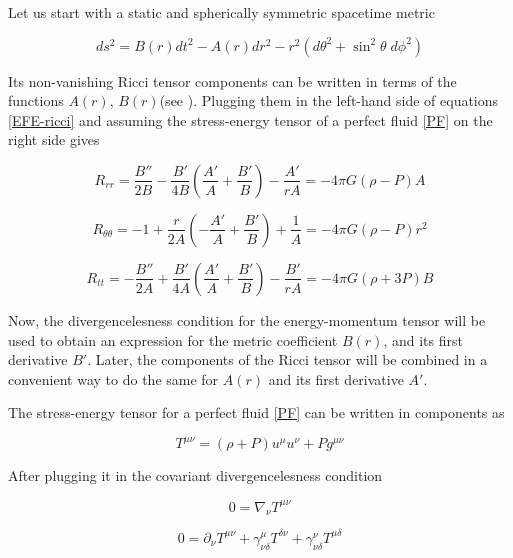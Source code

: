 Let us start with a static and spherically symmetric spacetime metric

\begin{equation}\label{metric}
ds^2 = B(r) dt^2 - A(r) dr^2 - r^2 (d\theta^2 + \sin^2 \theta \; d\phi^2)
\end{equation}

Its non-vanishing Ricci tensor components can be written in terms of the functions $A(r)$, $B(r)$(see \cite{Weinberg:1972kfs}). Plugging them in the left-hand side of equations \ref{EFE-ricci} and assuming the stress-energy tensor of a perfect fluid \ref{PF} on the right side gives

\begin{equation}\label{E1}
R_{rr} = \frac{B''}{2B} - \frac{B'}{4B} \left( \frac{A'}{A}+\frac{B'}{B} \right) - \frac{A'}{rA} = -4\pi G(\rho-P) A
\end{equation}

\begin{equation}\label{E2}
R_{\theta \theta}  = -1 + \frac{r}{2A} \left( -\frac{A'}{A} + \frac{B'}{B} \right) + \frac{1}{A} = -4\pi G(\rho - P) r^2
\end{equation}

\begin{equation}\label{E3}
R_{tt} = - \frac{B''}{2A} + \frac{B'}{4A} \left( \frac{A'}{A}+\frac{B'}{B} \right) - \frac{B'}{rA} = - 4\pi G (\rho + 3P) B
\end{equation}

Now, the divergencelesness condition for the energy-momentum tensor will be used to obtain an expression for the metric coefficient $B(r)$, and its first derivative $B'$. Later, the components of the Ricci tensor will be combined in a convenient way to do the same for $A(r)$ and its first derivative $A'$. 

The stress-energy tensor for a perfect fluid \ref{PF} can be written in components as

\begin{equation}
T^{\mu \nu} = (\rho + P) u^\mu u^\nu + P g^{\mu \nu}
\end{equation}

After plugging it in the covariant divergencelesness condition 

\begin{equation}
0 = \nabla_\nu T^{\mu \nu}
\end{equation}

\begin{equation}
0 =  \partial_\nu T^{\mu \nu} + \gamma^\mu_{\nu \delta} T^{\delta \nu} + \gamma^\nu_{\nu \delta} T^{\mu \delta}
\end{equation}

